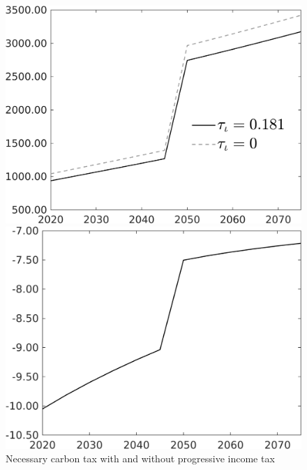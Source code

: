  \begin{figure}[h!!]
 	\centering
 	\caption{Necessary carbon tax with and without progressive income tax  }\label{fig:Limit_nsk0_xgr0_know}		
 	\begin{minipage}[]{0.32\textwidth}
 		\includegraphics[width=1\textwidth]{../../codding_model/own_basedOnFried/optimalPol_010922_revision/figures/all_13Sept22/CompTauf_bytaul_Reg0_Tauf_spillover0_nsk0_xgr0_knspil0_sep0_LFlimit1_emsbase0_countec0_GovRev0_etaa0.79_lgd1.png}
 	\end{minipage}		\begin{minipage}[]{0.32\textwidth}
 	\includegraphics[width=1\textwidth]{../../codding_model/own_basedOnFried/optimalPol_010922_revision/figures/all_13Sept22/CompTaufPER_bytaul_Reg0_Tauf_spillover0_nsk0_xgr0_knspil0_sep0_LFlimit1_emsbase0_countec0_GovRev0_etaa0.79_lgd0.png} \end{minipage}		

\end{figure}
